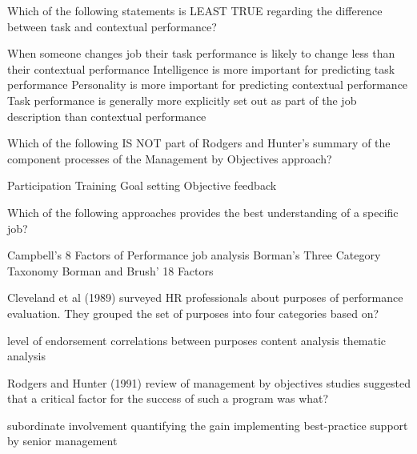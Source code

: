 \documentclass[12pt, a4paper]{exam}\usepackage[]{graphicx}\usepackage[]{color}
\begin{document}
\begin{questions}
\filbreak
\question
 Which of the following statements is LEAST TRUE regarding the difference between task and contextual performance?
\begin{choices}
\choice When someone changes job their task performance is likely to change less than their contextual performance
\choice Intelligence is more important for predicting task performance
\choice Personality is more important for predicting contextual performance
\choice Task performance is generally more explicitly set out as part of the job description than contextual performance
\vspace{10 mm}
\end{choices}


\filbreak
\question
 Which of the following IS NOT part of Rodgers and Hunter's summary of the component processes of the Management by Objectives approach?
\begin{choices}
\choice Participation
\choice Training
\choice Goal setting
\choice Objective feedback
\vspace{10 mm}
\end{choices}


\filbreak
\question
 Which of the following approaches provides the best understanding of a specific job?
\begin{choices}
\choice Campbell's 8 Factors of Performance
\choice job analysis
\choice Borman's Three Category Taxonomy
\choice Borman and Brush' 18 Factors
\vspace{10 mm}
\end{choices}


\filbreak
\question
 Cleveland et al (1989) surveyed HR professionals about purposes of performance evaluation. They grouped the set of purposes into four categories based on?
\begin{choices}
\choice level of endorsement
\choice correlations between purposes
\choice content analysis
\choice thematic analysis
\vspace{10 mm}
\end{choices}


\filbreak
\question
 Rodgers and Hunter (1991) review of management by objectives studies suggested that a critical factor for the success of such a program was what?
\begin{choices}
\choice subordinate involvement
\choice quantifying the gain
\choice implementing best-practice
\choice support by senior management
\vspace{10 mm}
\end{choices}



\end{questions}
\end{document}
